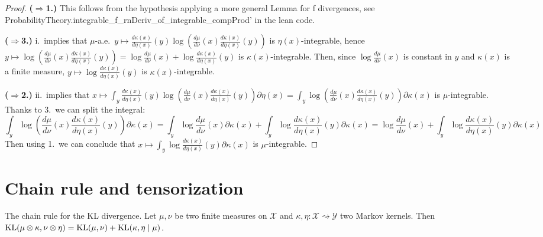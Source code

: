 \begin{proof}
{\bfseries($\Rightarrow$1.)} This follows from the hypothesis applying a more general Lemma for f divergences, see ProbabilityTheory.integrable\_f\_rnDeriv\_of\_integrable\_compProd' in the lean code.

{\bfseries($\Rightarrow$3.)} i.\ implies that $\mu$-a.e.\ $y \mapsto \frac{d \kappa(x)}{d \eta(x)}(y) \log \left(\frac{d \mu}{d \nu}(x) \frac{d \kappa(x)}{d \eta(x)}(y) \right)$ is $\eta(x)$-integrable, hence $y \mapsto \log \left(\frac{d \mu}{d \nu}(x) \frac{d \kappa(x)}{d \eta(x)}(y) \right) = \log \frac{d \mu}{d \nu}(x) + \log \frac{d \kappa(x)}{d \eta(x)}(y)$ is $\kappa(x)$-integrable. Then, since $\log \frac{d \mu}{d \nu}(x)$ is constant in $y$ and $\kappa(x)$ is a finite measure, $y \mapsto \log \frac{d \kappa(x)}{d \eta(x)}(y)$ is $\kappa(x)$-integrable.

{\bfseries($\Rightarrow$2.)} ii.\ implies that $x \mapsto  \int_y \frac{d \kappa(x)}{d \eta(x)}(y) \log \left(\frac{d \mu}{d \nu}(x) \frac{d \kappa(x)}{d \eta(x)}(y) \right) \partial \eta (x) = \int_y \log \left(\frac{d \mu}{d \nu}(x) \frac{d \kappa(x)}{d \eta(x)}(y) \right) \partial \kappa (x)$ is $\mu$-integrable. 
Thanks to 3.\ we can split the integral:
$$\int_y \log \left(\frac{d \mu}{d \nu}(x) \frac{d \kappa(x)}{d \eta(x)}(y) \right) \partial \kappa (x)
= \int_y \log \frac{d \mu}{d \nu}(x) \partial \kappa (x) + \int_y \log \frac{d \kappa(x)}{d \eta(x)}(y) \partial \kappa (x) = \log \frac{d \mu}{d \nu}(x) + \int_y \log \frac{d \kappa(x)}{d \eta(x)}(y) \partial \kappa (x)$$
Then using 1.\ we can conclude that $x \mapsto \int_y \log \frac{d \kappa(x)}{d \eta(x)}(y) \partial \kappa (x)$ is $\mu$-integrable.

\end{proof}



\section{Chain rule and tensorization}

\begin{theorem}
  \label{thm:kl_compProd}
  \leanok
  The chain rule for the KL divergence. Let $\mu, \nu$ be two finite measures on $\mathcal X$ and $\kappa, \eta : \mathcal X \rightsquigarrow \mathcal Y$ two Markov kernels.
  Then $\operatorname{KL}(\mu \otimes \kappa, \nu \otimes \eta) = \operatorname{KL}(\mu, \nu) + \operatorname{KL}(\kappa, \eta \mid \mu)$.
\end{theorem}

